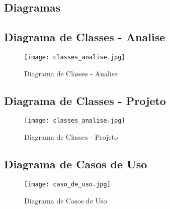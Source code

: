 \begin{landscape}
\section{Diagramas}\label{diagramas}

\subsection{Diagrama de Classes - Analise}
\begin{figure}[htb]
	\centering
	\texttt{[image: classes\_analise.jpg]}
	\caption{Diagrama de Classes - Analise}
\end{figure}

\clearpage

\subsection{Diagrama de Classes - Projeto}
\begin{figure}[htb]
	\centering
	\texttt{[image: classes\_analise.jpg]}
	\caption{Diagrama de Classes - Projeto}
\end{figure}

\clearpage

\subsection{Diagrama de Casos de Uso}
\begin{figure}[htb]
	\centering
	\texttt{[image: caso\_de\_uso.jpg]}
	\caption{Diagrama de Casos de Uso}
\end{figure}
\end{landscape}